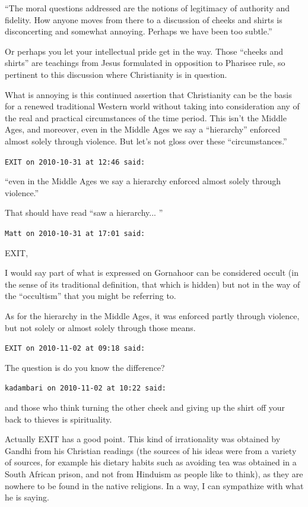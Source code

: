 \begin{footnotesize}
\begin{sffamily}
``The moral questions addressed are the notions of legitimacy of authority and fidelity. How anyone moves from there to a discussion of cheeks and shirts is disconcerting and somewhat annoying. Perhaps we have been too subtle.''

Or perhaps you let your intellectual pride get in the way. Those ``cheeks and shirts'' are teachings from Jesus formulated in opposition to Pharisee rule, so pertinent to this discussion where Christianity is in question.

What is annoying is this continued assertion that Christianity can be the basis for a renewed traditional Western world without taking into consideration any of the real and practical circumstances of the time period. This isn't the Middle Ages, and moreover, even in the Middle Ages we say a ``hierarchy'' enforced almost solely through violence. But let's not gloss over these ``circumstances.''

\hfill

\texttt{EXIT on 2010-10-31 at 12:46 said:}

``even in the Middle Ages we say a hierarchy enforced almost solely through violence.''

That should have read ``saw a hierarchy... ''

\hfill

\texttt{Matt on 2010-10-31 at 17:01 said:}

EXIT,

I would say part of what is expressed on Gornahoor can be considered occult (in the sense of its traditional definition, that which is hidden) but not in the way of the ``occultism'' that you might be referring to.

As for the hierarchy in the Middle Ages, it was enforced partly through violence, but not solely or almost solely through those means.

\hfill

\texttt{EXIT on 2010-11-02 at 09:18 said:}

The question is do you know the difference?

\hfill

\texttt{kadambari on 2010-11-02 at 10:22 said:}

and those who think turning the other cheek and giving up the shirt off your back to thieves is spirituality.

Actually EXIT has a good point. This kind of irrationality was obtained by Gandhi from his Christian readings (the sources of his ideas were from a variety of sources, for example his dietary habits such as avoiding tea was obtained in a South African prison, and not from Hinduism as people like to think), as they are nowhere to be found in the native religions. In a way, I can sympathize with what he is saying.


\end{sffamily}
\end{footnotesize}
